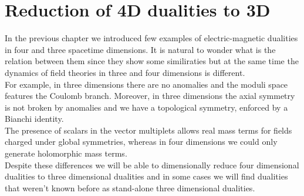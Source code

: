 
\chapter{Reduction of 4D dualities to 3D}

% 


In the previous chapter we introduced few examples of electric-magnetic dualities in four and three spacetime dimensions.
It is natural to wonder what is the relation between them since they show some similiraties but at the same time the dynamics of field theories in three and four dimensions is different.\\
For example, in three dimensions there are no anomalies and the moduli space features the Coulomb branch. 
Moreover, in three dimensions the axial symmetry is not broken by anomalies and we have a topological symmetry, enforced by a Bianchi identity.\\
The presence of scalars in the vector multiplets allows real mass terms for fields charged under global symmetries, whereas in four dimensions we could only generate holomorphic mass terms.\\
Despite these differences we will be able to dimensionally reduce four dimensional dualities to three dimensional dualities and in some cases we will find dualities that weren't known before as stand-alone three dimensional dualities.\\


